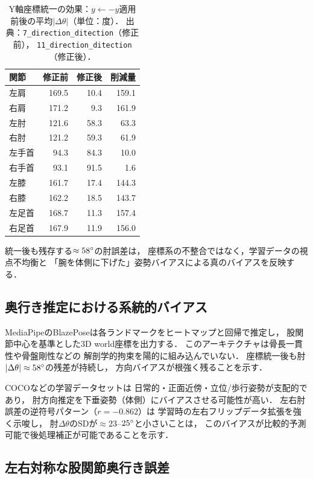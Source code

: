 \documentclass[twocolumn]{article}
\begin{document}
\begin{table}[!t]
\centering
\caption{Y軸座標統一の効果：$y \leftarrow -y$適用前後の平均$|\Delta\theta|$（単位：度）．
  出典：\texttt{7\_direction\_ditection}（修正前），
  \texttt{11\_direction\_ditection}（修正後）．}
\label{tab:yflip_effect}
\small
\begin{tabular}{lrrr}
\toprule
関節     & 修正前 & 修正後 & 削減量 \\
\midrule
左肩  & 169.5 & 10.4 & 159.1 \\
右肩  & 171.2 &  9.3 & 161.9 \\
左肘  & 121.6 & 58.3 &  63.3 \\
右肘  & 121.2 & 59.3 &  61.9 \\
左手首 &  94.3 & 84.3 &  10.0 \\
右手首 &  93.1 & 91.5 &   1.6 \\
左膝  & 161.7 & 17.4 & 144.3 \\
右膝  & 162.2 & 18.5 & 143.7 \\
左足首 & 168.7 & 11.3 & 157.4 \\
右足首 & 167.9 & 11.9 & 156.0 \\
\bottomrule
\end{tabular}
\end{table}

統一後も残存する$\approx58\degree{}$の肘誤差は，
座標系の不整合ではなく，学習データの視点不均衡と
「腕を体側に下げた」姿勢バイアスによる真のバイアスを反映する．

\subsection{奥行き推定における系統的バイアス}

MediaPipeのBlazePoseは各ランドマークをヒートマップと回帰で推定し，
股関節中心を基準とした3D world座標を出力する\cite{blazepose}．
このアーキテクチャは骨長一貫性や骨盤剛性などの
解剖学的拘束を陽的に組み込んでいない．
座標統一後も肘$|\Delta\theta|\approx58\degree{}$の残差が持続し，
方向バイアスが根強く残ることを示す．

COCO\cite{coco}などの学習データセットは
日常的・正面近傍・立位/歩行姿勢が支配的であり，
肘方向推定を下垂姿勢（体側）にバイアスさせる可能性が高い．
左右肘誤差の逆符号パターン（$r=-0.862$）は
学習時の左右フリップデータ拡張を強く示唆し，
肘$\Delta\theta$のSDが$\approx23$--$25\degree{}$と小さいことは，
このバイアスが比較的予測可能で後処理補正が可能であることを示す．

\subsection{左右対称な股関節奥行き誤差}
\end{document}
